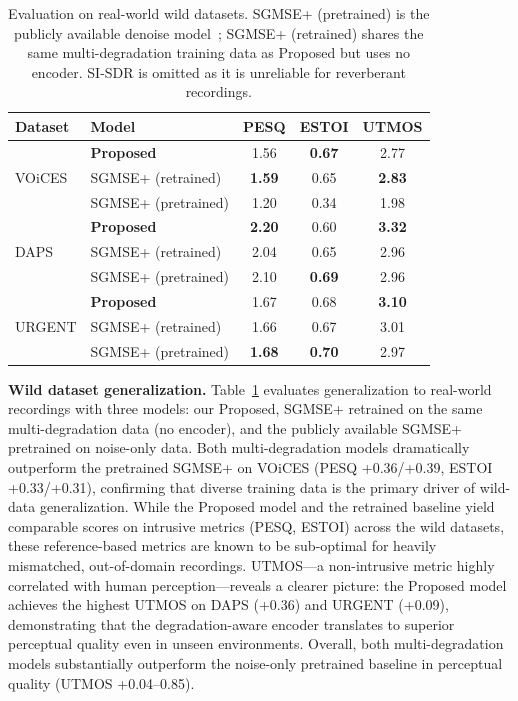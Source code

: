 \documentclass[cameraready]{Interspeech}
\begin{document}
\begin{table}[!t]
\centering
\caption{Evaluation on real-world wild datasets. SGMSE+ (pretrained) is the publicly available denoise model~\cite{richter2023speech}; SGMSE+ (retrained) shares the same multi-degradation training data as Proposed but uses no encoder. SI-SDR is omitted as it is unreliable for reverberant recordings.}
\label{tab:wild}
\small
\begin{tabular}{ll|ccc}
\toprule
Dataset & Model & PESQ & ESTOI & UTMOS \\
\midrule
\multirow{3}{*}{VOiCES} & \textbf{Proposed} & 1.56 & \textbf{0.67} & 2.77 \\
& SGMSE+ (retrained) & \textbf{1.59} & 0.65 & \textbf{2.83} \\
& SGMSE+ (pretrained) & 1.20 & 0.34 & 1.98 \\
\midrule
\multirow{3}{*}{DAPS} & \textbf{Proposed} & \textbf{2.20} & 0.60 & \textbf{3.32} \\
& SGMSE+ (retrained) & 2.04 & 0.65 & 2.96 \\
& SGMSE+ (pretrained) & 2.10 & \textbf{0.69} & 2.96 \\
\midrule
\multirow{3}{*}{URGENT} & \textbf{Proposed} & 1.67 & 0.68 & \textbf{3.10} \\
& SGMSE+ (retrained) & 1.66 & 0.67 & 3.01 \\
& SGMSE+ (pretrained) & \textbf{1.68} & \textbf{0.70} & 2.97 \\
\bottomrule
\end{tabular}
\end{table}

\textbf{Wild dataset generalization.}
Table~\ref{tab:wild} evaluates generalization to real-world recordings with three models: our Proposed, SGMSE+ retrained on the same multi-degradation data (no encoder), and the publicly available SGMSE+ pretrained on noise-only data.
Both multi-degradation models dramatically outperform the pretrained SGMSE+ on VOiCES (PESQ +0.36/+0.39, ESTOI +0.33/+0.31), confirming that diverse training data is the primary driver of wild-data generalization.
While the Proposed model and the retrained baseline yield comparable scores on intrusive metrics (PESQ, ESTOI) across the wild datasets, these reference-based metrics are known to be sub-optimal for heavily mismatched, out-of-domain recordings.
UTMOS---a non-intrusive metric highly correlated with human perception---reveals a clearer picture: the Proposed model achieves the highest UTMOS on DAPS (+0.36) and URGENT (+0.09), demonstrating that the degradation-aware encoder translates to superior perceptual quality even in unseen environments.
Overall, both multi-degradation models substantially outperform the noise-only pretrained baseline in perceptual quality (UTMOS +0.04--0.85).
\end{document}
